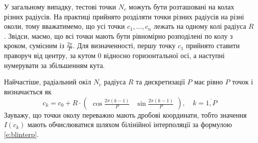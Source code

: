 У загальному випадку, тестові точки $N_c$ можуть бути розташовані на колах різних радіусів. 
На практиці прийнято розділяти точки різних радіусів на різні околи, тому вважатимемо, що усі точки $c_1,...,c_n$ лежать на одному колі радіуса $R$.
Звідси, маємо, що всі точки мають бути рівномірно розподілені по колу з кроком, сумісним із $\frac{2\pi}{P}$.
Для визначенності, першу точку $c_1$ прийнято ставити праворуч від центру, за кутом 0 відносно горизонтальної осі, а наступні нумерувати за збільшенням кута.

Найчастіше, радіальний окіл $N_c$ радіуса $R$ та дискретизації $P$ має рівно $P$ точок і визначається як
\begin{equation}\label{e:circle}
    c_k = c_0 + R \cdot \begin{pmatrix} \cos \frac{2\pi (k-1)}{P} & \sin \frac{2\pi (k-1)}{P} \end{pmatrix}, \quad k=\overline{1,P}
\end{equation}
Зауважу, що точки околу переважно мають дробові координати, тобто значення $I(c_k)$ мають обчислюватися шляхом білінійної інтерполяції за формулою \ref{e:blinterp}.

